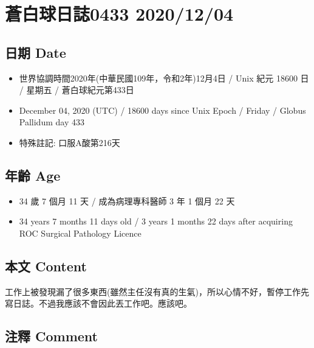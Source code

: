 \documentclass[
]{article}
\providecommand{\tightlist}{%
  \setlength{\itemsep}{0pt}\setlength{\parskip}{0pt}}
\begin{document}
\hypertarget{ux84bcux767dux7403ux65e5ux8a8c0433-20201204}{%
\section{蒼白球日誌0433
2020/12/04}\label{ux84bcux767dux7403ux65e5ux8a8c0433-20201204}}

\hypertarget{ux65e5ux671f-date-3}{%
\subsection{日期 Date}\label{ux65e5ux671f-date-3}}

\begin{itemize}
\tightlist
\item
  世界協調時間2020年(中華民國109年，令和2年)12月4日 / Unix 紀元 18600 日
  / 星期五 / 蒼白球紀元第433日
\item
  December 04, 2020 (UTC) / 18600 days since Unix Epoch / Friday /
  Globus Pallidum day 433
\item
  特殊註記: 口服A酸第216天
\end{itemize}

\hypertarget{ux5e74ux9f61-age-3}{%
\subsection{年齡 Age}\label{ux5e74ux9f61-age-3}}

\begin{itemize}
\tightlist
\item
  34 歲 7 個月 11 天 / 成為病理專科醫師 3 年 1 個月 22 天
\item
  34 years 7 months 11 days old / 3 years 1 months 22 days after
  acquiring ROC Surgical Pathology Licence
\end{itemize}

\hypertarget{ux672cux6587-content-3}{%
\subsection{本文 Content}\label{ux672cux6587-content-3}}

工作上被發現漏了很多東西(雖然主任沒有真的生氣)，所以心情不好，暫停工作先寫日誌。不過我應該不會因此丟工作吧。應該吧。

\hypertarget{ux6ce8ux91cb-comment-3}{%
\subsection{注釋 Comment}\label{ux6ce8ux91cb-comment-3}}
\end{document}

